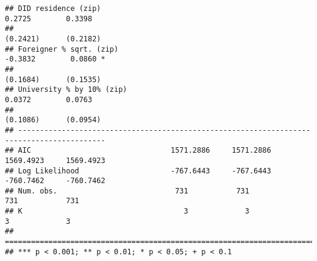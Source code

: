 \documentclass[
]{article}
\begin{document}
\begin{verbatim}
## DID residence (zip)                                                0.2725        0.3398   
##                                                                   (0.2421)      (0.2182)  
## Foreigner % sqrt. (zip)                                           -0.3832        0.0860 * 
##                                                                   (0.1684)      (0.1535)  
## University % by 10% (zip)                                          0.0372        0.0763   
##                                                                   (0.1086)      (0.0954)  
## ------------------------------------------------------------------------------------------
## AIC                                1571.2886     1571.2886      1569.4923     1569.4923   
## Log Likelihood                     -767.6443     -767.6443      -760.7462     -760.7462   
## Num. obs.                           731           731            731           731        
## K                                     3             3              3             3        
## ==========================================================================================
## *** p < 0.001; ** p < 0.01; * p < 0.05; + p < 0.1
\end{verbatim}
\end{document}
